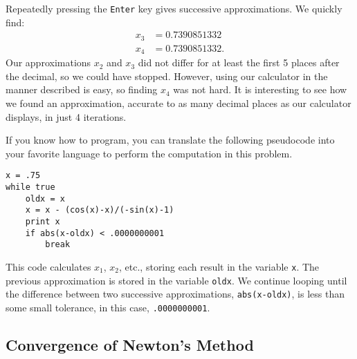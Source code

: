 \begin{example}
Repeatedly pressing the \texttt{Enter} key gives successive approximations.  We quickly find:
\begin{align*}
x_3 &= 0.7390851332\\
x_4 &= 0.7390851332.
\end{align*}
Our approximations $x_2$ and $x_3$ did not differ for at least the first 5 places after the decimal, so we could have stopped. However, using our calculator in the manner described is easy, so finding $x_4$ was not hard. It is interesting to see how we found an approximation, accurate to as many decimal places as our calculator displays, in just 4 iterations.
\end{example}

If you know how to program, you can translate the following pseudocode into your favorite language to perform the computation in this problem.
\begin{center}
\begin{verbatim}
x = .75
while true
    oldx = x
    x = x - (cos(x)-x)/(-sin(x)-1)
    print x
    if abs(x-oldx) < .0000000001
        break
\end{verbatim}
\end{center}


This code calculates $x_1$, $x_2$, etc., storing each result in the variable \texttt{x}.  The previous approximation is stored in the variable \texttt{oldx}.  We continue looping until the difference between two successive approximations, \texttt{abs(x-oldx)}, is less than some small tolerance, in this case,
\texttt{.0000000001}.

\subsection{Convergence of Newton's Method}

